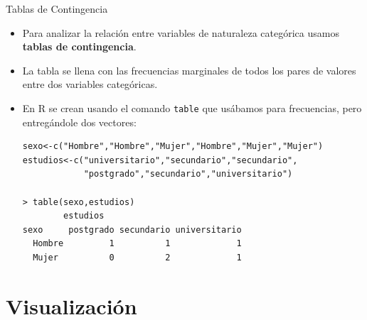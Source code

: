 \documentclass[handout]{beamer}
\begin{document}
\begin{frame}[fragile]{Tablas de Contingencia}
\scriptsize{
\begin{itemize}
 \item Para analizar la relación entre variables de naturaleza categórica usamos \textbf{tablas de contingencia}.
 \item La tabla se llena con las frecuencias marginales de todos los pares de valores entre dos variables categóricas.
 \item En R se crean usando el comando \verb+table+ que usábamos para frecuencias, pero entregándole dos vectores:
 \begin{verbatim}
sexo<-c("Hombre","Hombre","Mujer","Hombre","Mujer","Mujer")
estudios<-c("universitario","secundario","secundario",
            "postgrado","secundario","universitario")
            
> table(sexo,estudios)
        estudios
sexo     postgrado secundario universitario
  Hombre         1          1             1
  Mujer          0          2             1    
 \end{verbatim}

 
 
\end{itemize}


} 
\end{frame}






\section{Visualización}
\end{document}
